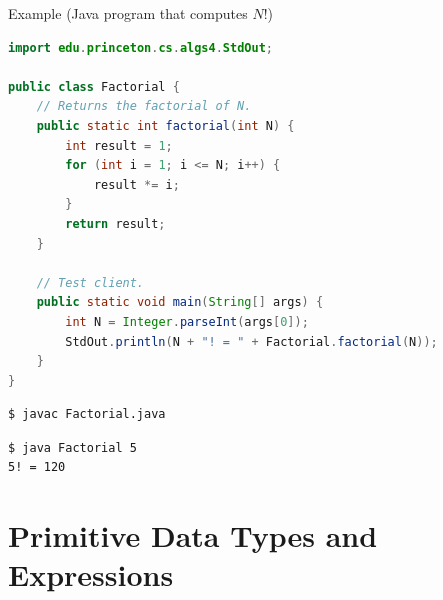 \documentclass[8pt,a4paper,compress]{beamer}
\begin{document}
\begin{frame}[fragile]
\pause

Example (Java program that computes $N!$)

\begin{lstlisting}[language=Java]
import edu.princeton.cs.algs4.StdOut;

public class Factorial {
    // Returns the factorial of N.
    public static int factorial(int N) {
        int result = 1;
        for (int i = 1; i <= N; i++) {
            result *= i;
        }
        return result;
    }

    // Test client.
    public static void main(String[] args) {
        int N = Integer.parseInt(args[0]);
        StdOut.println(N + "! = " + Factorial.factorial(N));
    }
}
\end{lstlisting}

\pause

\begin{lstlisting}[language={}]
$ javac Factorial.java
\end{lstlisting}

\pause

\begin{lstlisting}[language={}]
$ java Factorial 5
5! = 120
\end{lstlisting}
\end{frame}

\section{Primitive Data Types and Expressions}
\end{document}

